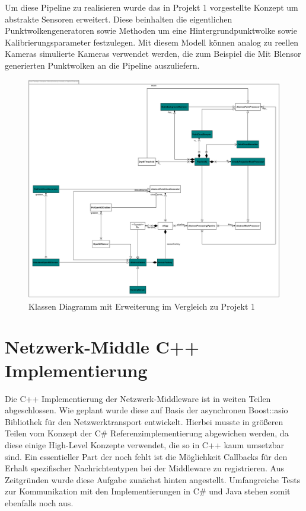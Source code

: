 Um diese Pipeline zu realisieren wurde das in Projekt 1 vorgestellte Konzept um 
abstrakte Sensoren erweitert. Diese beinhalten die eigentlichen 
Punktwolkengeneratoren sowie Methoden um eine Hintergrundpunktwolke sowie 
Kalibrierungsparameter festzulegen. Mit diesem Modell können analog zu reellen 
Kameras simulierte Kameras verwendet werden, die zum Beispiel die Mit Blensor 
generierten Punktwolken an die Pipeline auszuliefern.

\begin{figure}[H]
	\centering
	\includegraphics[width=\textwidth]{figs/class_diagram}
	\caption{Klassen Diagramm mit Erweiterung im Vergleich zu Projekt 1}
	\label{fig:classdiag}
\end{figure}

\section{Netzwerk-Middle C++ Implementierung}
Die C++ Implementierung der Netzwerk-Middleware ist in weiten Teilen abgeschlossen. 
Wie geplant wurde diese auf Basis der asynchronen Boost::asio Bibliothek für den 
Netzwerktransport entwickelt. Hierbei musste in größeren Teilen vom Konzept der C\# 
Referenzimplementierung abgewichen werden, da diese einige High-Level Konzepte 
verwendet, die so in C++ kaum umsetzbar sind. Ein essentieller Part der noch fehlt 
ist die Möglichkeit Callbacks für den Erhalt spezifischer Nachrichtentypen bei der 
Middleware zu registrieren. Aus Zeitgründen wurde diese Aufgabe zunächst hinten 
angestellt. Umfangreiche Tests zur Kommunikation mit den Implementierungen in C\# 
und Java stehen somit ebenfalls noch aus.

